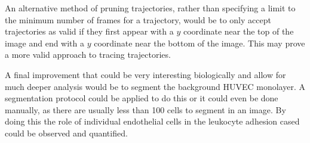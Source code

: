An alternative method of pruning trajectories, rather than specifying a limit to the minimum number of frames for a trajectory, would be to only accept trajectories as valid if they first appear with a $y$ coordinate near the top of the image and end with a $y$ coordinate near the bottom of the image. This may prove a more valid approach to tracing trajectories.

A final improvement that could be very interesting biologically and allow for much deeper analysis would be to segment the background HUVEC monolayer. A segmentation protocol could be applied to do this or it could even be done manually, as there are usually less than 100 cells to segment in an image. By doing this the role of individual endothelial cells in the leukocyte adhesion cased could be observed and quantified. 

